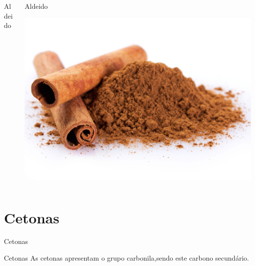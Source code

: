 \documentclass[presentation,professionalfonts,aspectratio=169]{beamer}
\begin{document}
\begin{frame}[label={sec:orga314ac5}]{}
\begin{columns}
\begin{column}{0.45\columnwidth}
\begin{block}{Aldeido}

\end{block}
\end{column}


\begin{column}{0.45\columnwidth}
\begin{block}{Aldeido}
\begin{center}
\includegraphics[width=.9\linewidth]{QO/FuncoesOxigenadas/canela.jpg}
\end{center}
\end{block}
\end{column}
\end{columns}
\end{frame}


\section{Cetonas}
\label{sec:orgf3f9ec7}

\begin{frame}[label={sec:org3ec9742}]{Cetonas}
\begin{mybox}{Cetonas}
As cetonas apresentam o grupo carbonila,sendo este carbono secundário.
\begin{center}
\end{center}
\end{mybox}
\end{frame}
\end{document}
